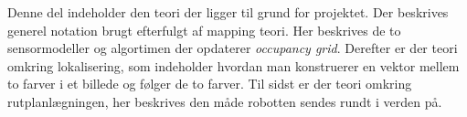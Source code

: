 Denne del indeholder den teori der ligger til grund for projektet.
Der beskrives generel notation brugt efterfulgt af mapping teori.
Her beskrives de to sensormodeller og algortimen der opdaterer \textit{occupancy grid}.
Derefter er der teori omkring lokalisering, som indeholder hvordan man konstruerer en vektor mellem to farver i et billede og følger de to farver.
Til sidst er der teori omkring rutplanlægningen, her beskrives den måde robotten sendes rundt i verden på.